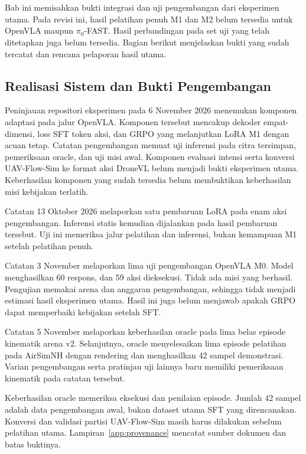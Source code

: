 \chapter{\babEmpat}
\label{cha:pengujian}
Bab ini memisahkan bukti integrasi dan uji pengembangan dari eksperimen utama. Pada revisi ini, hasil pelatihan penuh M1 dan M2 belum tersedia untuk OpenVLA maupun $\pi_0$-FAST. Hasil perbandingan pada set uji yang telah ditetapkan juga belum tersedia. Bagian berikut menjelaskan bukti yang sudah tercatat dan rencana pelaporan hasil utama.

\section{Realisasi Sistem dan Bukti Pengembangan}
\label{sec:realisasi_eksperimen}
Peninjauan repositori eksperimen pada 6 November 2026 menemukan komponen adaptasi pada jalur OpenVLA. Komponen tersebut mencakup dekoder empat-dimensi, loss SFT token aksi, dan GRPO yang melanjutkan LoRA M1 dengan acuan tetap. Catatan pengembangan memuat uji inferensi pada citra tersimpan, pemeriksaan oracle, dan uji misi awal. Komponen evaluasi intensi serta konversi UAV-Flow-Sim ke format aksi DroneVL belum menjadi bukti eksperimen utama. Keberhasilan komponen yang sudah tersedia belum membuktikan keberhasilan misi kebijakan terlatih.

Catatan 13 Oktober 2026 melaporkan satu pembaruan LoRA pada enam aksi pengembangan. Inferensi statis kemudian dijalankan pada hasil pembaruan tersebut. Uji ini memeriksa jalur pelatihan dan inferensi, bukan kemampuan M1 setelah pelatihan penuh.

Catatan 3 November melaporkan lima uji pengembangan OpenVLA M0. Model menghasilkan 60 respons, dan 59 aksi dieksekusi. Tidak ada misi yang berhasil. Pengujian memakai arena dan anggaran pengembangan, sehingga tidak menjadi estimasi hasil eksperimen utama. Hasil ini juga belum menjawab apakah GRPO dapat memperbaiki kebijakan setelah SFT.

Catatan 5 November melaporkan keberhasilan oracle pada lima belas episode kinematik arena v2. Selanjutnya, oracle menyelesaikan lima episode pelatihan pada AirSimNH dengan rendering dan menghasilkan 42 sampel demonstrasi. Varian pengembangan serta pratinjau uji lainnya baru memiliki pemeriksaan kinematik pada catatan tersebut.

Keberhasilan oracle memeriksa eksekusi dan penilaian episode. Jumlah 42 sampel adalah data pengembangan awal, bukan dataset utama SFT yang direncanakan. Konversi dan validasi partisi UAV-Flow-Sim masih harus dilakukan sebelum pelatihan utama. Lampiran~\ref{app:provenance} mencatat sumber dokumen dan batas buktinya.

